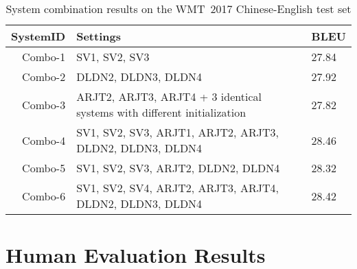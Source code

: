 \documentclass[a4paper]{article}
\begin{document}
\begin{CJK*}{UTF8}{gbsn}
\begin{table}[ht]
\centering
\begin{tabular}{@{}rll@{}}
\textbf{SystemID} &\textbf{Settings}                                       & \textbf{BLEU} \\
\toprule
Combo-1 & SV1, SV2, SV3     & 27.84       \\ 
Combo-2 & DLDN2, DLDN3, DLDN4 & 27.92 \\
Combo-3 &  ARJT2, ARJT3, ARJT4 + 3 identical systems with different initialization    & 27.82 \\
\midrule
Combo-4 & SV1, SV2, SV3, ARJT1, ARJT2, ARJT3, DLDN2, DLDN3, DLDN4 & 28.46\\
Combo-5 & SV1, SV2, SV3, ARJT2, DLDN2, DLDN4 & 28.32 \\
Combo-6 & SV1, SV2, SV4, ARJT2, ARJT3, ARJT4, DLDN2, DLDN3, DLDN4     & 28.42 \\
\bottomrule
\end{tabular}
\caption{System combination results on the WMT~2017 Chinese-English test set}
\label{exp_systemcomb}
\end{table} 


\newcommand{\ExptNine}{Combo-1}
\newcommand{\ExptNLC}{Combo-2}
\newcommand{\Single}{SV1}

\newcommand{\ComboA}{\textsc{Combo-4}}
\newcommand{\ComboB}{\textsc{Combo-5}}
\newcommand{\ComboC}{\textsc{Combo-6}}

\newcommand{\Sogou}{\textsc{Sogou}}
\newcommand{\Microsoft}{\textsc{Online-A-1710}}
\newcommand{\Google}{\textsc{Online-B-1710}}

\newcommand{\MetaA}{\textsc{Meta-1}}
\newcommand{\MetaB}{\textsc{Meta-2}}
\newcommand{\MetaC}{\textsc{Meta-3}}

\newcommand{\SubsetA}{\textsc{Subset-0}}
\newcommand{\SubsetB}{\textsc{Subset-1}}
\newcommand{\SubsetC}{\textsc{Subset-2}}
\newcommand{\SubsetD}{\textsc{Subset-3}}
\newcommand{\SubsetE}{\textsc{Subset-4}}

\newcommand{\newstest}{\textsc{newstest2017}}
\newcommand{\RefWMT}{\textsc{Reference-WMT}}
\newcommand{\RefHT}{\textsc{Reference-HT}}
\newcommand{\RefPE}{\textsc{Reference-PE}}

\section{Human Evaluation Results}
\label{sec:human-eval-results}

\nocite{edgington1980validity}
\nocite{wilcoxon1945individual}


\end{CJK*}
\end{document}
